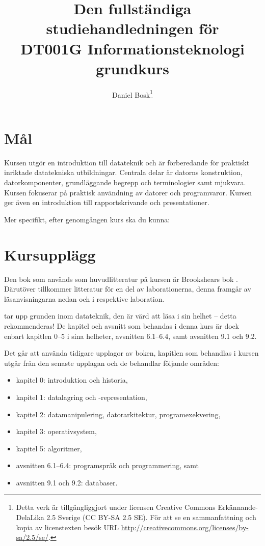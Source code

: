 \documentclass[a4paper,logo]{miunart}
\title{Den fullständiga studiehandledningen för\\
  DT001G Informationsteknologi grundkurs}
\author{
  Daniel Bosk\footnote{%
    Detta verk är tillgängliggjort under licensen Creative Commons 
    Erkännande-DelaLika 2.5 Sverige (CC BY-SA 2.5 SE).
    För att se en sammanfattning och kopia av licenstexten besök URL 
    \url{http://creativecommons.org/licenses/by-sa/2.5/se/}.
  }
}
\date{\svnId}
\begin{document}
\maketitle
\tableofcontents


\section{Mål}
\label{sec:aim}
Kursen utgör en introduktion till datateknik och är förberedande för praktiskt 
inriktade datatekniska utbildningar.
Centrala delar är datorns konstruktion, datorkomponenter, grundläggande begrepp 
och terminologier samt mjukvara.
Kursen fokuserar på praktisk användning av datorer och programvaror.
Kursen ger även en introduktion till rapportskrivande och presentationer.

Mer specifikt, efter genomgången kurs ska du kunna:
\begin{itemize}
  
  
  
  
  
\end{itemize}


\section{Kursupplägg}
\label{sec:outline}
Den bok som används som huvudlitteratur på kursen är Brookshears bok 
 \cite{Brookshear2012csa}.
Därutöver tillkommer litteratur för en del av laborationerna, denna framgår av 
läsanvisningarna nedan och i respektive laboration.

\citet{Brookshear2012csa} tar upp grunden inom datateknik, den är värd att läsa 
i sin helhet -- detta rekommenderas!
De kapitel och avsnitt som behandas i denna kurs är dock enbart kapitlen 0--5 
i sina helheter, avsnitten 6.1--6.4, samt avsnitten 9.1 och 9.2.

Det går att använda tidigare upplagor av boken, kapitlen som behandlas i kursen 
utgår från den senaste upplagan \citep{Brookshear2012csa} och de behandlar 
följande områden:
\begin{itemize}
	\item kapitel 0: introduktion och historia,
	\item kapitel 1: datalagring och -representation,
	\item kapitel 2: datamanipulering, datorarkitektur, programexekvering,
	\item kapitel 3: operativsystem,
  \item kapitel 5: algoritmer,
  \item avsnitten 6.1--6.4: programspråk och programmering, samt
  \item avsnitten 9.1 och 9.2: databaser.
\end{itemize}
\end{document}
